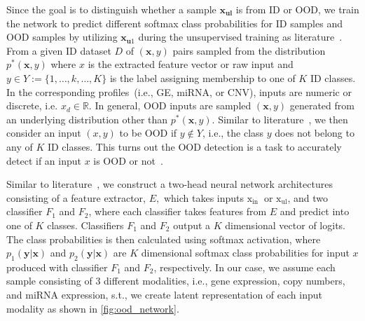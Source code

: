 \hspace*{3.5mm} Since the goal is to distinguish whether a sample $\mathbf{x}_{\mathbf{ul}}$ is from ID or OOD, we train the network to predict different softmax class probabilities for ID samples and OOD samples by utilizing $\mathbf{x}_{\mathbf{u}1}$ during the unsupervised training as literature~\cite{OOD19}. From a given ID dataset ${D}$ of $(\boldsymbol{x}, y)$ pairs sampled from the distribution $p^{*}(\boldsymbol{x}, y)$ where $x$ is the extracted feature vector or raw input and $y \in {Y}:=\{1, \ldots, k, \ldots, K\}$ is the label assigning membership to one of $K$ ID classes. In the corresponding profiles~(i.e., GE, miRNA, or CNV), inputs are numeric or discrete, i.e. $x_{d} \in \mathbb{R}$. In general, OOD inputs are sampled $(\boldsymbol{x}, y)$ generated from an underlying distribution other than $p^{*}(\boldsymbol{x}, y)$. Similar to literature~\cite{OOD1}, we then consider an input $(x, y)$ to be OOD if $y \notin {Y}$, i.e., the class $y$ does not belong to any of $K$ ID classes. This turns out the OOD detection is a task to accurately detect if an input $x$ is OOD or not~\cite{OOD1,OOD2,OOD3}.

\hspace*{3.5mm} Similar to literature~\cite{yu2019unsupervised}, we construct a two-head neural network architectures consisting of a feature extractor, $E,$ which takes inputs $\mathrm{x}_{\text {in }}$ or $\mathrm{x}_{\mathrm{ul}}$, and two classifier $F_{1}$ and $F_{2}$, where each classifier takes features from $E$ and predict into one of $K$ classes. Classifiers $F_{1}$ and $F_{2}$ output a $K$ dimensional vector of logits. The class probabilities is then calculated using softmax activation, where $p_{1}(\mathbf{y} | \mathbf{x})$ and $p_{2}(\mathbf{y} | \mathbf{x})$ are $K$ dimensional softmax class probabilities for input $x$ produced with classifier $F_{1}$ and $F_{2}$, respectively. In our case, we assume each sample consisting of 3 different modalities, i.e., gene expression, copy numbers, and miRNA expression, s.t., we create latent representation of each input modality as shown in \cref{fig:ood_network}. 

